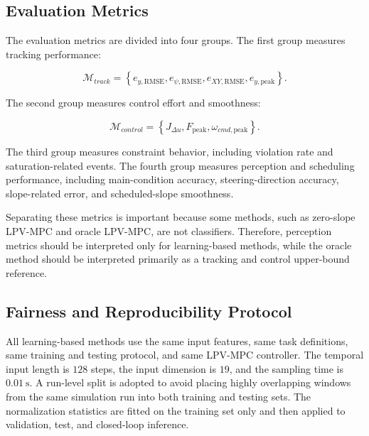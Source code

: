 \documentclass{ieeeaccess}
\begin{document}
\subsection{Evaluation Metrics}



The evaluation metrics are divided into four groups. The first group measures tracking performance:

\begin{equation}
\mathcal{M}_{track}
=
\left\{
e_{y,\mathrm{RMSE}},
e_{\psi,\mathrm{RMSE}},
e_{XY,\mathrm{RMSE}},
e_{y,\mathrm{peak}}
\right\}.
\label{eq:tracking_metrics}
\end{equation}

The second group measures control effort and smoothness:

\begin{equation}
\mathcal{M}_{control}
=
\left\{
J_{\Delta u},
F_{\mathrm{peak}},
\omega_{cmd,\mathrm{peak}}
\right\}.
\label{eq:control_metrics}
\end{equation}

The third group measures constraint behavior, including violation rate and saturation-related events. The fourth group measures perception and scheduling performance, including main-condition accuracy, steering-direction accuracy, slope-related error, and scheduled-slope smoothness.



Separating these metrics is important because some methods, such as zero-slope LPV-MPC and oracle LPV-MPC, are not classifiers. Therefore, perception metrics should be interpreted only for learning-based methods, while the oracle method should be interpreted primarily as a tracking and control upper-bound reference.



\subsection{Fairness and Reproducibility Protocol}



All learning-based methods use the same input features, same task definitions, same training and testing protocol, and same LPV-MPC controller. The temporal input length is $128$ steps, the input dimension is $19$, and the sampling time is $0.01~\mathrm{s}$. A run-level split is adopted to avoid placing highly overlapping windows from the same simulation run into both training and testing sets. The normalization statistics are fitted on the training set only and then applied to validation, test, and closed-loop inference.
\end{document}
